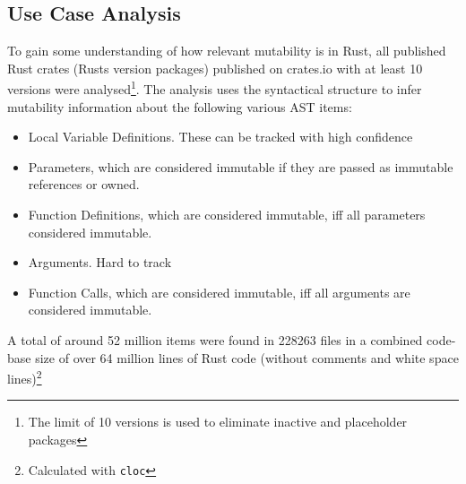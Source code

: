 \documentclass[11pt]{article}
\begin{document}
\newpage
\begin{appendices}

\section{Use Case Analysis}

To gain some understanding of how relevant mutability is in Rust, all published Rust crates (Rusts version packages) published on crates.io with at least 10 versions were analysed\footnote{The limit of 10 versions is used to eliminate inactive and placeholder packages}. The analysis uses the syntactical structure to infer mutability information about the following various AST items:
\begin{itemize}
	\item Local Variable Definitions. These can be tracked with high confidence
	\item Parameters, which are considered immutable if they are passed as immutable references or owned.
	\item Function Definitions, which are considered immutable, iff all parameters considered immutable.
	\item Arguments. Hard to track
	\item Function Calls, which are considered immutable, iff all arguments are considered immutable.
\end{itemize}
A total of around 52 million items were found in 228263 files in a combined code-base size of over 64 million lines of Rust code (without comments and white space lines)\footnote{Calculated with \texttt{cloc}}




\end{appendices}
\end{document}
